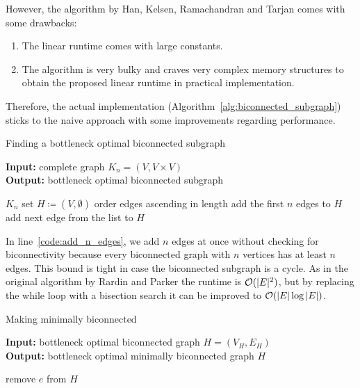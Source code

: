 However, the algorithm by Han, Kelsen, Ramachandran and Tarjan comes with some drawbacks:
\begin{enumerate}
  \item The linear runtime comes with large constants.
  \item The algorithm is very bulky and craves very complex memory structures to obtain the proposed linear runtime in practical implementation.
\end{enumerate}

Therefore, the actual implementation (Algorithm~\ref{alg:biconnected_subgraph}) sticks to the naive approach with some improvements regarding performance.

\begin{algorithm}[ht!]
  \caption{Finding a bottleneck optimal biconnected subgraph}\label{alg:biconnected_subgraph}
  \textbf{Input:} complete graph \(K_n = (V, V \times V)\)\\
  \textbf{Output:} bottleneck optimal biconnected subgraph
  \begin{algorithmic}[1]
     {$K_n$}
      \State set \(H \coloneqq (V, \emptyset)\)
      \State order edges ascending in length
      \State add the first \(n\) edges to \(H\)\label{code:add_n_edges}
        \State add next edge from the list to \(H\)
      \EndWhile
      \State{}
    \EndProcedure
  \end{algorithmic}
\end{algorithm}

In line~\ref{code:add_n_edges}, we add \(n\) edges at once without checking for biconnectivity because every biconnected graph with \(n\) vertices has at least \(n\) edges. This bound is tight in case the biconnected subgraph is a cycle. As in the original algorithm by Rardin and Parker the runtime is \(\mathcal{O}(\vert E \vert^2)\), but by replacing the while loop with a bisection search it can be improved to \(\mathcal{O}(\vert E \vert\log \vert E \vert)\).

\begin{algorithm}[ht!]
  \caption{Making minimally biconnected}\label{alg:minimally_biconnected}
  \textbf{Input: } bottleneck optimal biconnected graph \(H = (V_H, E_H)\)\\
  \textbf{Output: } bottleneck optimal minimally biconnected graph \(H\)
  \begin{algorithmic}[1]
          \State remove \(e\) from \(H\)
        \EndIf
      \EndFor
      \State {}
    \EndProcedure
  \end{algorithmic}
\end{algorithm}

